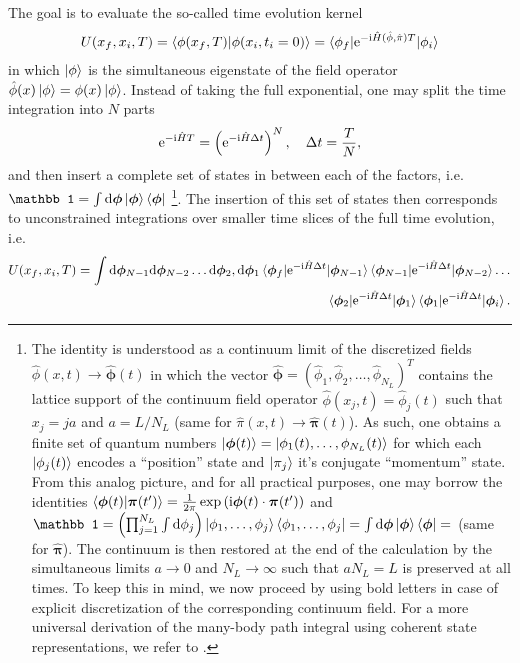 The goal is to evaluate the so-called time evolution kernel
\begin{align}
    U(x_f,x_i,T) = \braket{\phi(x_f,T)|\phi(x_i,t_i=0)}=\braket{\phi_f|\mathrm e^{-\mathrm i\hat H(\hat\phi,\hat\pi) T}|\phi_i}
    \label{eq:time_evolution_kernel}
\end{align}
in which $\ket{\phi}$ is the simultaneous eigenstate of the field operator $\hat\phi(x)\ket{\phi}=\phi(x)\ket{\phi}$.
Instead of taking the full exponential, one may split the time integration into $N$ parts
\begin{align}
    \mathrm e^{-\mathrm i\hat HT}=\left( \mathrm e^{-\mathrm i\hat H\Delta t} \right)^N
    ,
    \quad
    \Delta t = \frac TN
    ,
\end{align}
and then insert a complete set of states in between each of the factors, i.e. $\mathbb 1=\int\rd\bm\phi\ket{\bm\phi}\bra{\bm\phi}$
\footnote{
    The identity is understood as a continuum limit of the discretized fields $\hat\phi(x,t)\rightarrow{\hat{\bm\phi}}(t)$ in which the vector $\hat{\bm\phi}=(\hat\phi_1,\hat\phi_2,\dots,\hat\phi_{N_L})^T$ contains the lattice support of the continuum field operator $\hat\phi(x_j,t)=\hat\phi_j(t)$ such that $x_j=ja$ and $a=L/N_L$ (same for $\hat\pi(x,t)\rightarrow\hat{\bm\pi}(t)$).
    As such, one obtains a finite set of quantum numbers $\ket{\bm\phi(t)}=\ket{\phi_1(t),\dots,\phi_{N_L}(t)}$ for which each $\ket{\phi_j(t)}$ encodes a ``position'' state and $\ket{\pi_j}$ it's conjugate ``momentum'' state.
    From this analog picture, and for all practical purposes, one may borrow the identities $\braket{\bm\phi(t)|\bm\pi(t')}=\frac1{2\pi}\exp\left( \mathrm i\bm\phi(t)\cdot\bm\pi(t') \right)$ and $\mathbb1=\brlr{\prod_{j=1}^{N_L}\int\rd\phi_j}\ket{\phi_1,\dots,\phi_j}\bra{\phi_1,\dots,\phi_j}=\int\rd\bm\phi\ket{\bm\phi}\bra{\bm\phi}=$ (same for $\hat{\bm\pi}$).
    The continuum is then restored at the end of the calculation by the simultaneous limits $a\rightarrow0$ and $N_L\rightarrow\infty$ such that $aN_L=L$ is preserved at all times.
    To keep this in mind, we now proceed by using bold letters in case of explicit discretization of the corresponding continuum field.
    For a more universal derivation of the many-body path integral using coherent state representations, we refer to \cite{AltlandSimons2010}.
}.
The insertion of this set of states then corresponds to unconstrained integrations over smaller time slices of the full time evolution, i.e.
\begin{align}
    U(x_f,x_i,T) =
    \int{\mathrm d{\bm\phi}_{N-1}\mathrm d{\bm\phi}_{N-2}\dots\mathrm d{\bm\phi}_2,\mathrm d{\bm\phi}_1}
    \braket{\bm\phi_f|\mathrm e^{-\mathrm i\hat H\Delta t}|\bm\phi_{N-1}}
    \braket{\bm\phi_{{N-1}}|\mathrm e^{-\mathrm i\hat H\Delta t}|\bm\phi_{{N-2}}}
    \dots
    \nonumber\\
    \braket{\bm\phi_{2}|\mathrm e^{-\mathrm i\hat H\Delta t}|\bm\phi_{1}}
    \braket{\bm\phi_{1}|\mathrm e^{-\mathrm i\hat H\Delta t}|\bm\phi_i}.
\end{align}
